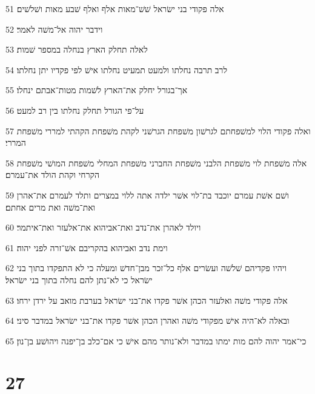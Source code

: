 \par 51 אלה פקודי בני ישׂראל שׁשׁ־מאות אלף ואלף שׁבע מאות ושׁלשׁים׃
\par 52 וידבר יהוה אל־משׁה לאמר׃
\par 53 לאלה תחלק הארץ בנחלה במספר שׁמות׃
\par 54 לרב תרבה נחלתו ולמעט תמעיט נחלתו אישׁ לפי פקדיו יתן נחלתו׃
\par 55 אך־בגורל יחלק את־הארץ לשׁמות מטות־אבתם ינחלו׃
\par 56 על־פי הגורל תחלק נחלתו בין רב למעט׃
\par 57 ואלה פקודי הלוי למשׁפחתם לגרשׁון משׁפחת הגרשׁני לקהת משׁפחת הקהתי למררי משׁפחת המררי׃
\par 58 אלה משׁפחת לוי משׁפחת הלבני משׁפחת החברני משׁפחת המחלי משׁפחת המושׁי משׁפחת הקרחי וקהת הולד את־עמרם׃
\par 59 ושׁם אשׁת עמרם יוכבד בת־לוי אשׁר ילדה אתה ללוי במצרים ותלד לעמרם את־אהרן ואת־משׁה ואת מרים אחתם׃
\par 60 ויולד לאהרן את־נדב ואת־אביהוא את־אלעזר ואת־איתמר׃
\par 61 וימת נדב ואביהוא בהקריבם אשׁ־זרה לפני יהוה׃
\par 62 ויהיו פקדיהם שׁלשׁה ועשׂרים אלף כל־זכר מבן־חדשׁ ומעלה כי לא התפקדו בתוך בני ישׂראל כי לא־נתן להם נחלה בתוך בני ישׂראל׃
\par 63 אלה פקודי משׁה ואלעזר הכהן אשׁר פקדו את־בני ישׂראל בערבת מואב על ירדן ירחו׃
\par 64 ובאלה לא־היה אישׁ מפקודי משׁה ואהרן הכהן אשׁר פקדו את־בני ישׂראל במדבר סיני׃
\par 65 כי־אמר יהוה להם מות ימתו במדבר ולא־נותר מהם אישׁ כי אם־כלב בן־יפנה ויהושׁע בן־נון׃

\chapter{27}

